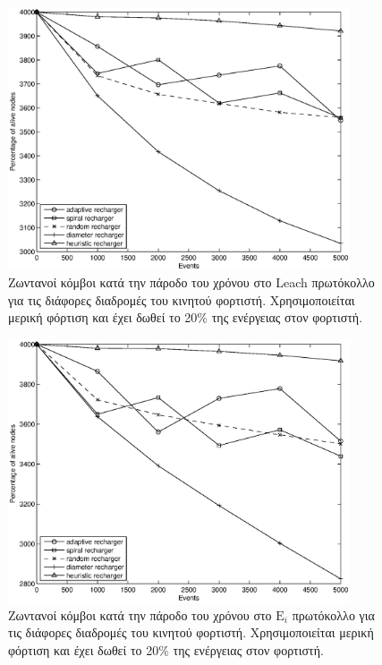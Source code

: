 \begin{figure}[H]
  \centering
  \includegraphics[width=0.9\textwidth]{experiments/4000nodes/4.ourVSnaive/alive_nodes_leach_rc_per_our-spiral-random-diameter-heuristic.eps}
  \caption{Ζωντανοί κόμβοι κατά την πάροδο του χρόνου στο Leach πρωτόκολλο για τις διάφορες διαδρομές του κινητού φορτιστή. Χρησιμοποιείται μερική φόρτιση και έχει
δωθεί το 20\% της ενέργειας στον φορτιστή.}
  \label{fig:5_4exp_1_2}
\end{figure}

\begin{figure}[H]
  \centering
  \includegraphics[width=0.9\textwidth]{experiments/4000nodes/4.ourVSnaive/alive_nodes_ei_rc_per_our-spiral-random-diameter-heuristic.eps}
  \caption{Ζωντανοί κόμβοι κατά την πάροδο του χρόνου στο $\text{E}_{i}$ πρωτόκολλο για τις διάφορες διαδρομές του κινητού φορτιστή. Χρησιμοποιείται μερική φόρτιση
και έχει δωθεί το 20\% της ενέργειας στον φορτιστή.}
  \label{fig:5_4exp_1_3}
\end{figure}



